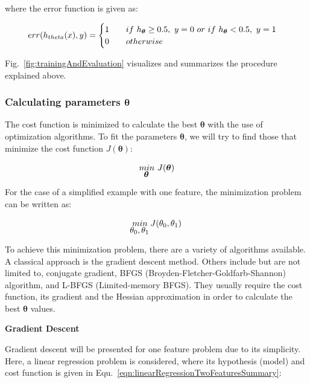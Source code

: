 \begin{enumerate}
	where the error function is given as:

	\begin{equation}{\label{eqn:misclassificationError}}
	  err(h_{theta}(x),y)=\begin{cases}
               1 \qquad if\ h_{{\bm{\theta}}}\geq0.5,\ y=0 \ or\ if \ h_{{\bm{\theta}}} < 0.5, \ y=1\\
               0 \qquad otherwise\\
            \end{cases}
	\end{equation} 

\end{enumerate}

Fig.~\ref{fig:trainingAndEvaluation} visualizes and summarizes the procedure explained above.

\subsubsection{Calculating parameters $\bm{\theta}$}

The cost function is minimized to calculate the best $\bm{\theta}$ with the use of optimization algorithms. To fit the parameters $\bm{\theta}$, we will try to find those that minimize the cost function $J({\bm{\theta}})$:

\begin{equation}{\label{eqn:optimizationGoal}}
\underaccent{{\displaystyle \bm{\theta}}}{min} \ J(\bm{\theta})
\end{equation} 

For the case of a simplified example with one feature, the minimization problem can be written as:

\begin{equation}{\label{eqn:optimizationGoalSimplified}}
\underaccent{{\displaystyle \theta_0, \theta_1}}{min} \ J(\theta_0,\theta_1)
\end{equation} 

To achieve this minimization problem, there are a variety of algorithms available. 
A classical approach is the gradient descent method.  
Others include but are not limited to, conjugate gradient, BFGS (Broyden-Fletcher-Goldfarb-Shannon) algorithm, and L-BFGS (Limited-memory BFGS). 
They usually require the cost function, its gradient and the Hessian approximation in order to calculate the best $\bm{\theta}$ values.

\textbf{Gradient Descent}

Gradient descent will be presented for one feature problem due to its simplicity. 
Here, a linear regression problem is considered, where its hypothesis (model) and cost function is given in Equ.~\ref{eqn:linearRegressionTwoFeaturesSummary}:

